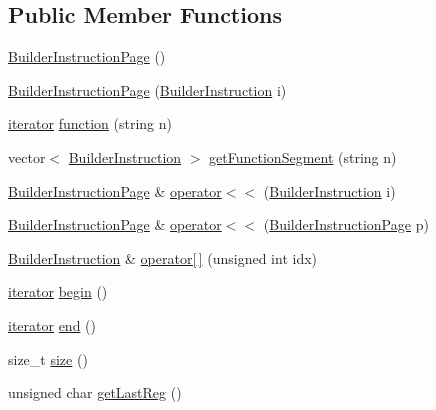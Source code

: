 \subsection*{Public Member Functions}
\begin{DoxyCompactItemize}
\item 
\hyperlink{classnightowl_1_1BuilderInstructionPage_a3fc7253cd5482f72a275594506c110fa}{Builder\-Instruction\-Page} ()
\item 
\hyperlink{classnightowl_1_1BuilderInstructionPage_af56dba9e048f2ac38fbb3d6c12d9445b}{Builder\-Instruction\-Page} (\hyperlink{classnightowl_1_1BuilderInstruction}{Builder\-Instruction} i)
\item 
\hyperlink{classnightowl_1_1BuilderInstructionPage_a58693e169efec9daf99b36da52049099}{iterator} \hyperlink{classnightowl_1_1BuilderInstructionPage_a57bd706420b11fe605ecd3e51e6843dc}{function} (string n)
\item 
vector$<$ \hyperlink{classnightowl_1_1BuilderInstruction}{Builder\-Instruction} $>$ \hyperlink{classnightowl_1_1BuilderInstructionPage_a85bf96b712bc7b82df83e73d147e32af}{get\-Function\-Segment} (string n)
\item 
\hyperlink{classnightowl_1_1BuilderInstructionPage}{Builder\-Instruction\-Page} \& \hyperlink{classnightowl_1_1BuilderInstructionPage_addadca2a88f90cfbda0c4bd2b1abc9a5}{operator$<$$<$} (\hyperlink{classnightowl_1_1BuilderInstruction}{Builder\-Instruction} i)
\item 
\hyperlink{classnightowl_1_1BuilderInstructionPage}{Builder\-Instruction\-Page} \& \hyperlink{classnightowl_1_1BuilderInstructionPage_adaf1a527ed9f14b813cf7bea9c8cc86b}{operator$<$$<$} (\hyperlink{classnightowl_1_1BuilderInstructionPage}{Builder\-Instruction\-Page} p)
\item 
\hyperlink{classnightowl_1_1BuilderInstruction}{Builder\-Instruction} \& \hyperlink{classnightowl_1_1BuilderInstructionPage_a4279538d87969f6850abaaa84705933a}{operator\mbox{[}$\,$\mbox{]}} (unsigned int idx)
\item 
\hyperlink{classnightowl_1_1BuilderInstructionPage_a58693e169efec9daf99b36da52049099}{iterator} \hyperlink{classnightowl_1_1BuilderInstructionPage_ab2d3252eea857d83729bd3dfdc3a02c9}{begin} ()
\item 
\hyperlink{classnightowl_1_1BuilderInstructionPage_a58693e169efec9daf99b36da52049099}{iterator} \hyperlink{classnightowl_1_1BuilderInstructionPage_a4ac80fa619d0ca906b80ce99f69d0183}{end} ()
\item 
size\-\_\-t \hyperlink{classnightowl_1_1BuilderInstructionPage_aaa634c0ab6da43c258e4dc564875aeef}{size} ()
\item 
unsigned char \hyperlink{classnightowl_1_1BuilderInstructionPage_a87669b3843a27972d370bcfa44006f85}{get\-Last\-Reg} ()
\end{DoxyCompactItemize}


